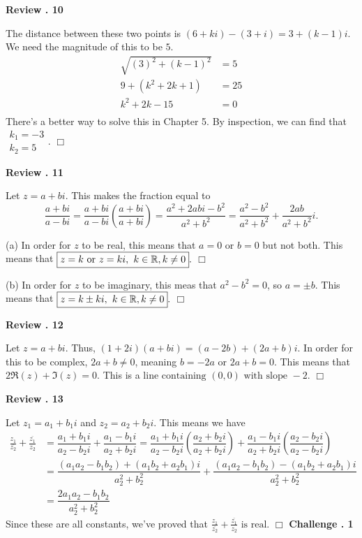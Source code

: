 \documentclass[lang=en,11pt]{elegantbook}
\begin{document}
\noindent \textbf{Review . 10}

The distance between these two points is $(6+ki)-(3+i)=3+(k-1)i$.  We need the magnitude of this to be $5$. \begin{align*}
    \sqrt{(3)^2+(k-1)^2}&=5 \\
    9+(k^2+2k+1)&=25 \\
    k^2+2k-15&=0 \\
\end{align*}
There's a better way to solve this in Chapter 5.  By inspection, we can find that $\boxed{\begin{matrix} k_1=-3 \\ k_2=5 \end{matrix}}.$ $\Box$\vspace{3mm}

\noindent \textbf{Review . 11}

Let $z=a+bi$.  This makes the fraction equal to $$\dfrac{a+bi}{a-bi}=\dfrac{a+bi}{a-bi}\left(\dfrac{a+bi}{a+bi}\right)=\dfrac{a^2+2abi-b^2}{a^2+b^2}=\dfrac{a^2-b^2}{a^2+b^2}+\dfrac{2ab}{a^2+b^2}i.$$

(a) In order for $z$ to be real, this means that $a=0$ or $b=0$ but not both.  This means that $\boxed{z=k \text{ or } z=ki, \hspace{0.05in} k\in\mathbb{R}, k\neq 0}.$ $\Box$\vspace{3mm}

(b) In order for $z$ to be imaginary, this meas that $a^2-b^2=0$, so $a=\pm b$.  This means that $\boxed{z=k\pm ki, \hspace{0.05in} k\in\mathbb{R}, k\neq 0}.$ $\Box$\vspace{3mm}

\noindent \textbf{Review . 12}

Let $z=a+bi.$  Thus, $(1+2i)(a+bi)=(a-2b)+(2a+b)i.$  In order for this to be complex, $2a+b\neq 0$, meaning $b=-2a$ or $2a+b=0$. This means that $2\Re(z)+\Im(z)=0$.  This is a $\boxed{\text{line containing }(0,0) \text{ with slope } -2}.$ $\Box$\vspace{3mm}

\noindent \textbf{Review . 13}

Let $z_1=a_1+b_1i$ and $z_2=a_2+b_2i$.  This means we have \begin{align*}
    \frac{z_1}{\overline{z_2}}+\frac{\overline{z_1}}{z_2}&=\dfrac{a_1+b_1i}{a_2-b_2i}+\dfrac{a_1-b_1i}{a_2+b_2i}=\dfrac{a_1+b_1i}{a_2-b_2i}\left(\dfrac{a_2+b_2i}{a_2+b_2i}\right)+\dfrac{a_1-b_1i}{a_2+b_2i}\left(\dfrac{a_2-b_2i}{a_2-b_2i}\right) \\
    &= \dfrac{(a_1a_2-b_1b_2)+(a_1b_2+a_2b_1)i}{a_2^2+b_2^2}+\dfrac{(a_1a_2-b_1b_2)-(a_1b_2+a_2b_1)i}{a_2^2+b_2^2} \\
    &=\dfrac{2a_1a_2-b_1b_2}{a_2^2+b_2^2}
\end{align*}
Since these are all constants, we've proved that $\displaystyle\boxed{\frac{z_1}{\overline{z_2}}+\frac{\overline{z_1}}{z_2} \text{ is real}}.$ $\Box$\vspace{3mm}
\newpage
\noindent \textbf{Challenge . 1}
\end{document}
